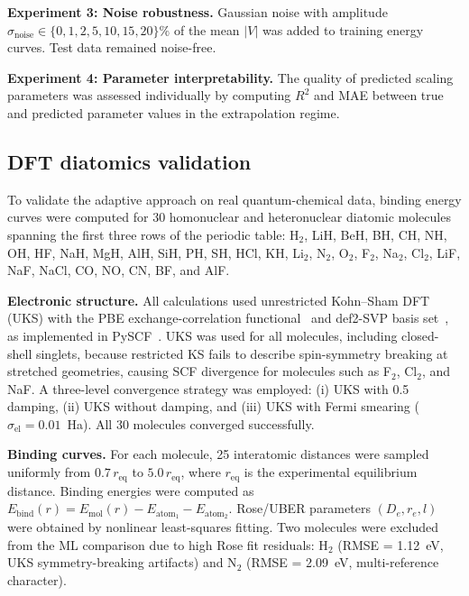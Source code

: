 \documentclass[aps,prb,twocolumn,superscriptaddress,longbibliography,floatfix]{revtex4-2}
\begin{document}
\textbf{Experiment 3: Noise robustness.} Gaussian noise with amplitude $\sigma_\mathrm{noise} \in \{0, 1, 2, 5, 10, 15, 20\}\%$ of the mean $|V|$ was added to training energy curves. Test data remained noise-free.

\textbf{Experiment 4: Parameter interpretability.} The quality of predicted scaling parameters was assessed individually by computing $R^2$ and MAE between true and predicted parameter values in the extrapolation regime.

\subsection{DFT diatomics validation}
\label{sec:dft_methods}

To validate the adaptive approach on real quantum-chemical data, binding energy curves were computed for 30 homonuclear and heteronuclear diatomic molecules spanning the first three rows of the periodic table: H$_2$, LiH, BeH, BH, CH, NH, OH, HF, NaH, MgH, AlH, SiH, PH, SH, HCl, KH, Li$_2$, N$_2$, O$_2$, F$_2$, Na$_2$, Cl$_2$, LiF, NaF, NaCl, CO, NO, CN, BF, and AlF.

\textbf{Electronic structure.} All calculations used unrestricted Kohn--Sham DFT (UKS) with the PBE exchange-correlation functional~\cite{Perdew1996} and def2-SVP basis set~\cite{Weigend2005}, as implemented in PySCF~\cite{Sun2018}. UKS was used for all molecules, including closed-shell singlets, because restricted KS fails to describe spin-symmetry breaking at stretched geometries, causing SCF divergence for molecules such as F$_2$, Cl$_2$, and NaF. A three-level convergence strategy was employed: (i) UKS with 0.5 damping, (ii) UKS without damping, and (iii) UKS with Fermi smearing ($\sigma_\mathrm{el} = 0.01$~Ha). All 30 molecules converged successfully.

\textbf{Binding curves.} For each molecule, 25 interatomic distances were sampled uniformly from $0.7\, r_\mathrm{eq}$ to $5.0\, r_\mathrm{eq}$, where $r_\mathrm{eq}$ is the experimental equilibrium distance. Binding energies were computed as $E_\mathrm{bind}(r) = E_\mathrm{mol}(r) - E_{\mathrm{atom}_1} - E_{\mathrm{atom}_2}$. Rose/UBER parameters $(D_e, r_e, l)$ were obtained by nonlinear least-squares fitting. Two molecules were excluded from the ML comparison due to high Rose fit residuals: H$_2$ (RMSE = 1.12~eV, UKS symmetry-breaking artifacts) and N$_2$ (RMSE = 2.09~eV, multi-reference character).
\end{document}
